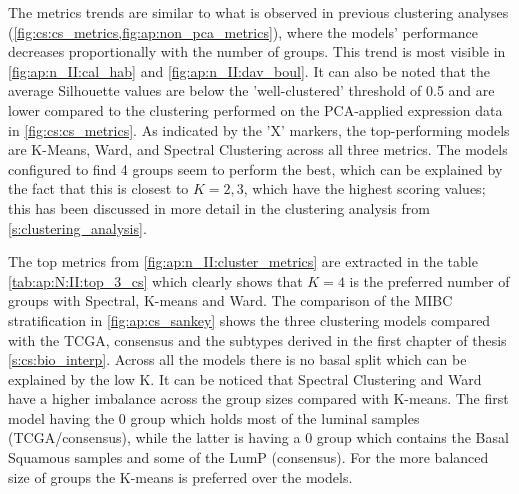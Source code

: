 The metrics trends are similar to what is observed in previous clustering analyses (\cref{fig:cs:cs_metrics,fig:ap:non_pca_metrics}), where the models' performance decreases proportionally with the number of groups. This trend is most visible in \cref{fig:ap:n_II:cal_hab} and \cref{fig:ap:n_II:dav_boul}. It can also be noted that the average Silhouette values are below the 'well-clustered' threshold of 0.5 and are lower compared to the clustering performed on the PCA-applied expression data in \cref{fig:cs:cs_metrics}. As indicated by the 'X' markers, the top-performing models are K-Means, Ward, and Spectral Clustering across all three metrics. The models configured to find 4 groups seem to perform the best, which can be explained by the fact that this is closest to $K=2,3$, which have the highest scoring values; this has been discussed in more detail in the clustering analysis from \cref{s:clustering_analysis}.

The top metrics from \cref{fig:ap:n_II:cluster_metrics} are extracted in the table \cref{tab:ap:N:II:top_3_cs} which clearly shows that $K=4$ is the preferred number of groups with Spectral, K-means and Ward. The comparison of the MIBC stratification in \cref{fig:ap:cs_sankey} shows the three clustering models compared with the TCGA, consensus and the subtypes derived in the first chapter of thesis \cref{s:cs:bio_interp}. Across all the models there is no basal split which can be explained by the low K. It can be noticed that Spectral Clustering and Ward have a higher imbalance across the group sizes compared with K-means. The first model having the 0 group which holds most of the luminal samples (TCGA/consensus), while the latter is having a 0 group which contains the Basal Squamous samples and some of the LumP (consensus). For the more balanced size of groups the K-means is preferred over the models.

